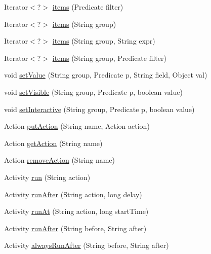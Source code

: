 \begin{DoxyCompactItemize}
\item 
\-Iterator$<$?$>$ \hyperlink{classprefuse_1_1_visualization_a6c3b3afd67dbfbb043cd88bbd381455c}{items} (\-Predicate filter)
\item 
\-Iterator$<$?$>$ \hyperlink{classprefuse_1_1_visualization_a885e9f4bded9bbab4a1917f3a4a18b70}{items} (\-String group)
\item 
\-Iterator$<$?$>$ \hyperlink{classprefuse_1_1_visualization_a9d82cbe84f471943bbe91db796a954b7}{items} (\-String group, \-String expr)
\item 
\-Iterator$<$?$>$ \hyperlink{classprefuse_1_1_visualization_a433c4633b6abd9b27fd05f89a1e53c25}{items} (\-String group, \-Predicate filter)
\item 
void \hyperlink{classprefuse_1_1_visualization_a133f85981830aa281dbf8e78709d2318}{set\-Value} (\-String group, \-Predicate p, \-String field, \-Object val)
\item 
void \hyperlink{classprefuse_1_1_visualization_aeff1a9b92b2b64dc4aad535c750b95a5}{set\-Visible} (\-String group, \-Predicate p, boolean value)
\item 
void \hyperlink{classprefuse_1_1_visualization_a3b9de7f2323164f1978fd23f632ff274}{set\-Interactive} (\-String group, \-Predicate p, boolean value)
\item 
\-Action \hyperlink{classprefuse_1_1_visualization_ab88ff623061fbf6688332aeb52c58188}{put\-Action} (\-String name, \-Action action)
\item 
\-Action \hyperlink{classprefuse_1_1_visualization_a18fa0b9e4af6b20d126ed138ff7ffc3d}{get\-Action} (\-String name)
\item 
\-Action \hyperlink{classprefuse_1_1_visualization_a658c6675d7a8ba545c0b578fcf456de8}{remove\-Action} (\-String name)
\item 
\-Activity \hyperlink{classprefuse_1_1_visualization_a4facaabe0cced10a0e87c04e811ca125}{run} (\-String action)
\item 
\-Activity \hyperlink{classprefuse_1_1_visualization_a9a9080be4ada951a50c8c7e71aa5c19f}{run\-After} (\-String action, long delay)
\item 
\-Activity \hyperlink{classprefuse_1_1_visualization_aa29e9521c0b10c016cf68058abf18e7e}{run\-At} (\-String action, long start\-Time)
\item 
\-Activity \hyperlink{classprefuse_1_1_visualization_af09ea7848a39f9988a6c7c6ea617b2cc}{run\-After} (\-String before, \-String after)
\item 
\-Activity \hyperlink{classprefuse_1_1_visualization_a205b6cb45694f35673f0d5685bb65c15}{always\-Run\-After} (\-String before, \-String after)

\end{DoxyCompactItemize}
